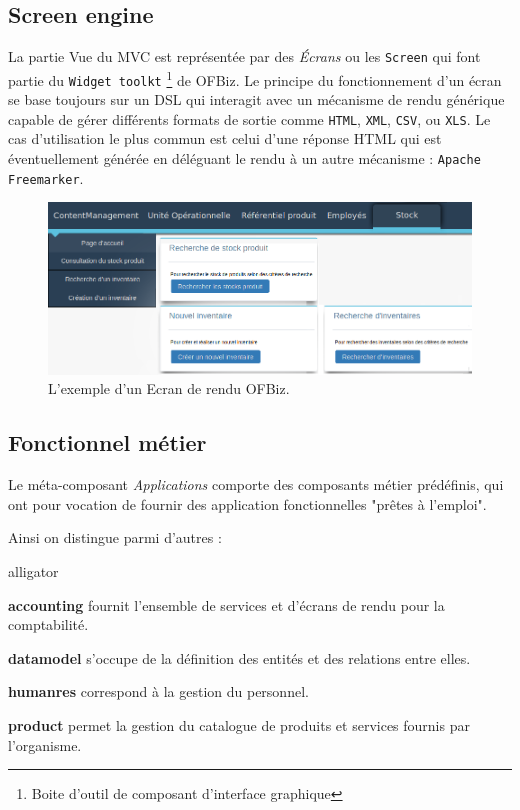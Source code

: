 \subsection{Screen engine}
La partie Vue du MVC est représentée par des \emph{Écrans} ou les \verb|Screen| qui font partie du \verb|Widget toolkt| \footnote{Boite d'outil de composant d'interface graphique} de OFBiz. Le principe du fonctionnement d'un écran se base toujours sur un DSL qui interagit avec un mécanisme de rendu générique capable de gérer différents formats de sortie comme \verb|HTML|, \verb|XML|, \verb|CSV|, ou \verb|XLS|. Le cas d'utilisation le plus commun est celui d'une réponse HTML qui est éventuellement générée en déléguant le rendu à un autre mécanisme : \verb|Apache Freemarker|.
\begin{figure}[h!]
	\includegraphics[width=\linewidth]{screenOfbiZ.png}
	\caption{L'exemple d'un Ecran de rendu OFBiz.}
	\label{fig:screen}
\end{figure}

\subsection{Fonctionnel métier}
Le méta-composant \emph{Applications} comporte des composants métier prédéfinis, qui ont pour vocation de fournir des application fonctionnelles "prêtes à l'emploi". 

Ainsi on distingue parmi d'autres :
\begin{labeling}{alligator}
	\item [\textbf{accounting}] fournit l'ensemble de services et d'écrans de rendu pour la comptabilité.
	\item [\textbf{datamodel}] s'occupe de la définition des entités et des relations entre elles.
	\item [\textbf{humanres}] correspond à la gestion du personnel.
	\item [\textbf{product}] permet la gestion du catalogue de produits et services fournis par l'organisme.
\end{labeling}

